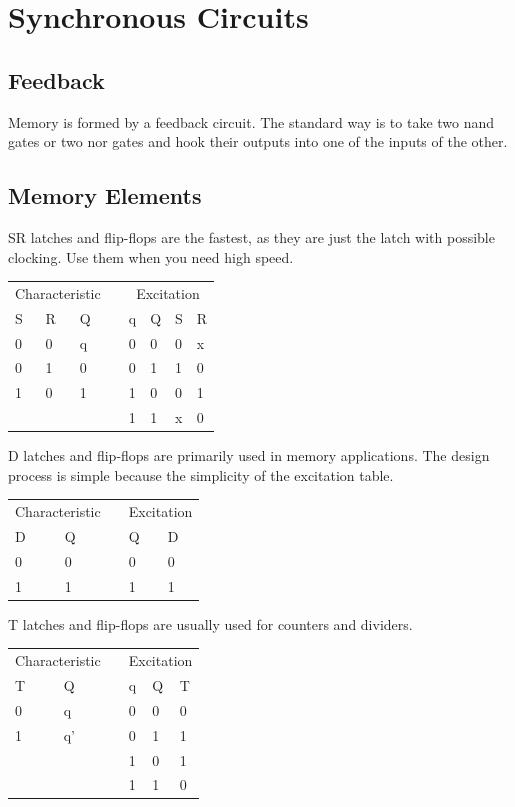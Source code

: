 \chapter{Synchronous Circuits}
\label{c-Sync}

\section{Feedback}

Memory is formed by a feedback circuit.  The standard way is to take two nand gates or two nor gates and hook their outputs into one of the inputs of the other.

\section{Memory Elements}

SR latches and flip-flops are the fastest, as they are just the latch with possible clocking.  Use them when you need high speed.

\noindent
\begin{tabular}{ll||lp{.25in}ll||ll}
\multicolumn{3}{c}{Characteristic} && \multicolumn{4}{c}{Excitation} \\
S & R & Q && q & Q & S & R \\ \cline{1-3} \cline{5-8}
0 & 0 & q && 0 & 0 & 0 & x \\
0 & 1 & 0 && 0 & 1 & 1 & 0 \\
1 & 0 & 1 && 1 & 0 & 0 & 1 \\
\multicolumn{3}{c}{} && 1 & 1 & x & 0 \\
\end{tabular}

D latches and flip-flops are primarily used in memory applications.  The design process is simple because the simplicity of the excitation table.

\noindent
\begin{tabular}{l||lp{.25in}l||l}
\multicolumn{2}{c}{Characteristic} && \multicolumn{2}{c}{Excitation} \\
D & Q                && Q & D \\ \cline{1-2} \cline{4-5}
0 & 0                && 0 & 0 \\
1 & 1                && 1 & 1 \\
\end{tabular}

T latches and flip-flops are usually used for counters and dividers.

\noindent
\begin{tabular}{l||lp{.25in}ll||l}
\multicolumn{2}{c}{Characteristic} && \multicolumn{3}{c}{Excitation} \\
T & Q                && q & Q & T \\ \cline{1-2} \cline{4-6}
0 & q                && 0 & 0 & 0 \\
1 & q'               && 0 & 1 & 1 \\
\multicolumn{2}{c}{} && 1 & 0 & 1 \\
\multicolumn{2}{c}{} && 1 & 1 & 0 \\
\end{tabular}

